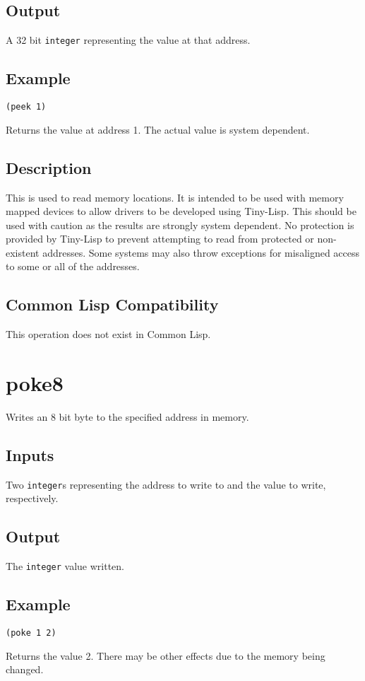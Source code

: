 \documentclass[10pt, openany]{book}
\newcommand{\datatype}[1]{\texttt{#1}}
\newcommand{\tl}{Tiny-Lisp}
\newcommand{\cl}{Common Lisp}
\begin{document}
\subsection{Output}
A 32 bit \datatype{integer} representing the value at that address.
\subsection{Example}
\begin{lstlisting}
(peek 1)
\end{lstlisting}
Returns the value at address 1.  The actual value is system dependent.
\subsection{Description}
This is used to read memory locations.  It is intended to be used with memory mapped devices to allow drivers to be developed using \tl{}.  This should be used with caution as the results are strongly system dependent.  No protection is provided by \tl{} to prevent attempting to read from protected or non-existent addresses.  Some systems may also throw exceptions for misaligned access to some or all of the addresses.
\subsection{Common Lisp Compatibility}
This operation does not exist in \cl.

\section{poke8}
Writes an 8 bit byte to the specified address in memory.
\subsection{Inputs}
Two \datatype{integer}s representing the address to write to and the value to write, respectively.
\subsection{Output}
The \datatype{integer} value written.
\subsection{Example}
\begin{lstlisting}
(poke 1 2)
\end{lstlisting}
Returns the value 2.  There may be other effects due to the memory being changed.
\end{document}
